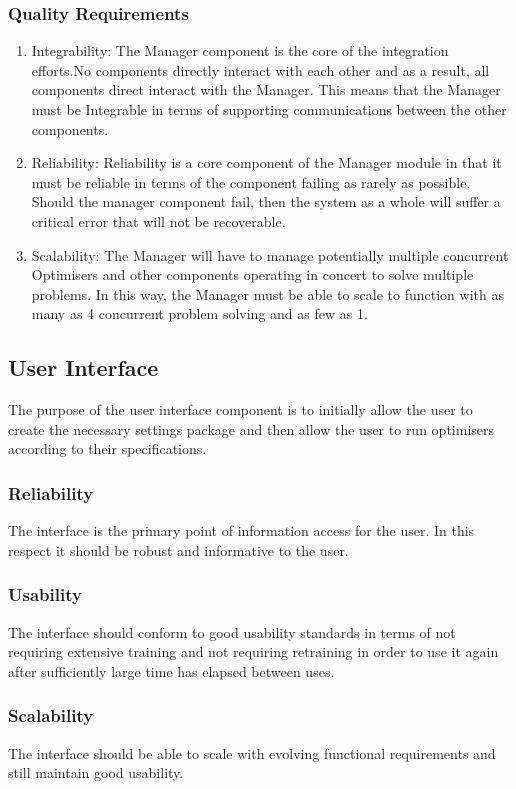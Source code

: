 \documentclass[11pt]{article}
\begin{document}
\subsubsection{Quality Requirements}
\begin{enumerate}
\item Integrability: The Manager component is the core of the integration efforts.No components directly interact with each other and as a result, all components direct interact with the Manager. This means that the Manager must be Integrable in terms of supporting communications between the other components.
\item Reliability: Reliability is a core component of the Manager module in that it must be reliable in terms of the component failing as rarely as possible. Should the manager component fail, then the system as a whole will suffer a critical error that will not be recoverable.
\item Scalability: The Manager will have to manage potentially multiple concurrent Optimisers and other components operating in concert to solve multiple problems. In this way, the Manager must be able to scale to function with as many as 4 concurrent problem solving and as few as 1.
\end{enumerate}

\subsection{User Interface}
The purpose of the user interface component is to initially allow the user to create the necessary settings package and then allow the user to run optimisers according to their specifications.
\subsubsection{Reliability}
The interface is the primary point of information access for the user. In this respect it should be robust and informative to the user.
\subsubsection{Usability}
The interface should conform to good usability standards in terms of not requiring extensive training and not requiring retraining in order to use it again after sufficiently large time has elapsed between uses.
\subsubsection{Scalability}
The interface should be able to scale with evolving functional requirements and still maintain good usability. 
\end{document}
